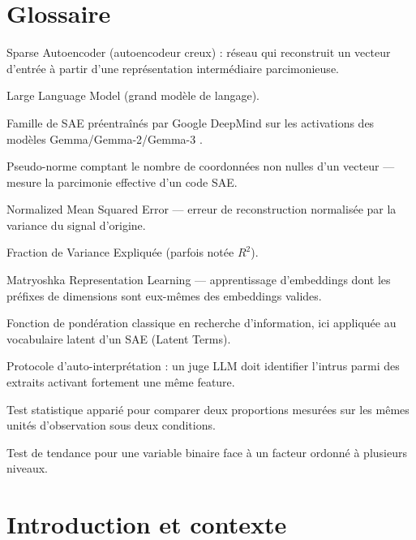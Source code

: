 \documentclass[11pt]{article}
\begin{document}
\section*{Glossaire}
\begin{description}[leftmargin=3.2cm, style=nextline]
  \item[SAE] Sparse Autoencoder (autoencodeur creux) : réseau qui reconstruit un
    vecteur d'entrée à partir d'une représentation intermédiaire parcimonieuse.
  \item[LLM] Large Language Model (grand modèle de langage).
  \item[GemmaScope] Famille de SAE préentraînés par Google DeepMind sur les
    activations des modèles Gemma/Gemma-2/Gemma-3 \cite{lieberum2024gemmascope}.
  \item[L0] Pseudo-norme comptant le nombre de coordonnées non nulles d'un
    vecteur --- mesure la parcimonie effective d'un code SAE.
  \item[NMSE] Normalized Mean Squared Error --- erreur de reconstruction
    normalisée par la variance du signal d'origine.
  \item[FVE] Fraction de Variance Expliquée (parfois notée $R^2$).
  \item[MRL] Matryoshka Representation Learning --- apprentissage d'embeddings
    dont les préfixes de dimensions sont eux-mêmes des embeddings valides.
  \item[BM25] Fonction de pondération classique en recherche d'information,
    ici appliquée au vocabulaire latent d'un SAE (Latent Terms).
  \item[odd-one-out] Protocole d'auto-interprétation : un juge LLM doit
    identifier l'intrus parmi des extraits activant fortement une même feature.
  \item[McNemar] Test statistique apparié pour comparer deux proportions
    mesurées sur les mêmes unités d'observation sous deux conditions.
  \item[Cochran-Armitage] Test de tendance pour une variable binaire face à un
    facteur ordonné à plusieurs niveaux.
\end{description}

\newpage
\section{Introduction et contexte}
\end{document}
